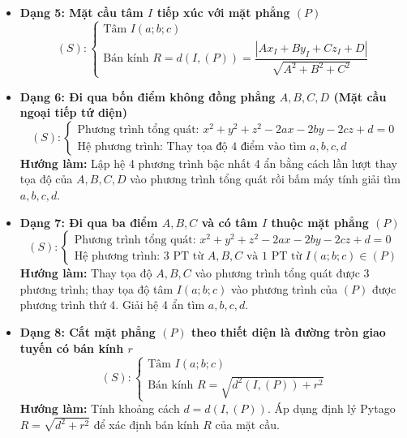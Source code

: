 \documentclass[12pt,a4paper]{article}
\begin{document}
\begin{theorybox}
\begin{itemize}
        \item \textbf{Dạng 5: Mặt cầu tâm $I$ tiếp xúc với mặt phẳng $(P)$}
        \[
            (S)\colon \begin{cases} \text{Tâm } I(a; b; c) \\ \text{Bán kính } R = d(I, (P)) = \dfrac{|Ax_I + By_I + Cz_I + D|}{\sqrt{A^2 + B^2 + C^2}} \end{cases}
        \]

        \item \textbf{Dạng 6: Đi qua bốn điểm không đồng phẳng $A, B, C, D$ (Mặt cầu ngoại tiếp tứ diện)}
        \[
            (S)\colon \begin{cases} \text{Phương trình tổng quát: } x^2 + y^2 + z^2 - 2ax - 2by - 2cz + d = 0 \\ \text{Hệ phương trình: Thay tọa độ } 4 \text{ điểm vào tìm } a, b, c, d \end{cases}
        \]
        \textbf{Hướng làm:} Lập hệ 4 phương trình bậc nhất 4 ẩn bằng cách lần lượt thay tọa độ của $A, B, C, D$ vào phương trình tổng quát rồi bấm máy tính giải tìm $a, b, c, d$.

        \item \textbf{Dạng 7: Đi qua ba điểm $A, B, C$ và có tâm $I$ thuộc mặt phẳng $(P)$}
        \[
            (S)\colon \begin{cases} \text{Phương trình tổng quát: } x^2 + y^2 + z^2 - 2ax - 2by - 2cz + d = 0 \\ \text{Hệ phương trình: } 3 \text{ PT từ } A, B, C \text{ và } 1 \text{ PT từ } I(a; b; c) \in (P) \end{cases}
        \]
        \textbf{Hướng làm:} Thay tọa độ $A, B, C$ vào phương trình tổng quát được 3 phương trình; thay tọa độ tâm $I(a; b; c)$ vào phương trình của $(P)$ được phương trình thứ 4. Giải hệ 4 ẩn tìm $a, b, c, d$.

        \item \textbf{Dạng 8: Cắt mặt phẳng $(P)$ theo thiết diện là đường tròn giao tuyến có bán kính $r$}
        \[
            (S)\colon \begin{cases} \text{Tâm } I(a; b; c) \\ \text{Bán kính } R = \sqrt{d^2(I, (P)) + r^2} \end{cases}
        \]
        \textbf{Hướng làm:} Tính khoảng cách $d = d(I, (P))$. Áp dụng định lý Pytago $R = \sqrt{d^2 + r^2}$ để xác định bán kính $R$ của mặt cầu.
    \end{itemize}
\end{theorybox}
\end{document}
